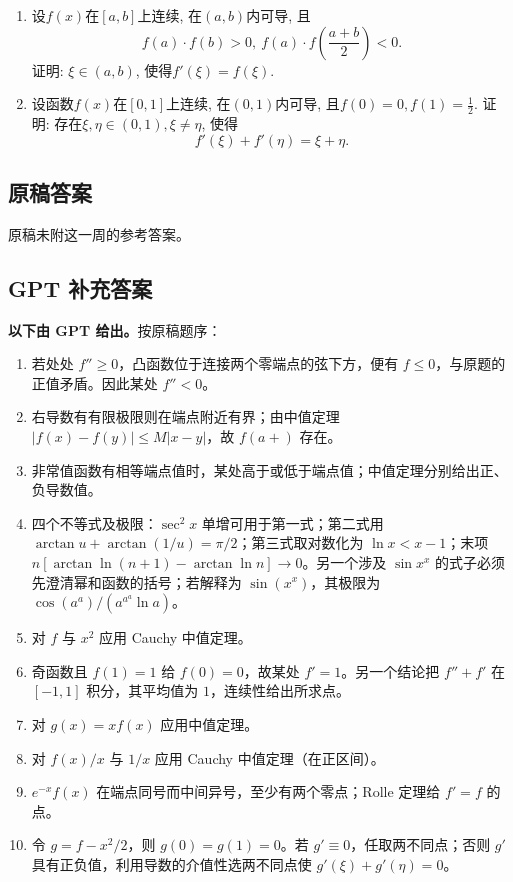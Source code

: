 \documentclass[UTF8,11pt, a4paper, oneside, fontset=none]{ctexbook}
\begin{document}
\begin{enumerate}
\item 设$f(x)$在$[a, b]$上连续, 在$(a, b)$内可导, 且
\[
f(a) \cdot f(b) >0, \ f(a) \cdot f\left( \frac{a+b}{2} \right) <0.
\]
证明: $\xi \in (a, b)$, 使得$f'(\xi) = f(\xi)$.

\item 设函数$f(x)$在$[0, 1]$上连续, 在$(0, 1)$内可导, 且$f(0) = 0, f(1) = \frac{1}{2}$. 证明: 存在$\xi, \eta \in (0, 1), \xi \neq \eta$, 使得
\[
f'(\xi) + f'(\eta) = \xi + \eta.
\]


\end{enumerate}

\clearpage

\subsection*{原稿答案}

\noindent 原稿未附这一周的参考答案。

\clearpage

\subsection*{GPT 补充答案}

\noindent\textbf{以下由 GPT 给出。}按原稿题序：
\begin{enumerate}
\item 若处处 $f''\ge0$，凸函数位于连接两个零端点的弦下方，便有 $f\le0$，与原题的正值矛盾。因此某处 $f''<0$。
\item 右导数有有限极限则在端点附近有界；由中值定理 $|f(x)-f(y)|\le M|x-y|$，故 $f(a+)$ 存在。
\item 非常值函数有相等端点值时，某处高于或低于端点值；中值定理分别给出正、负导数值。
\item 四个不等式及极限：$\sec^2x$ 单增可用于第一式；第二式用 $\arctan u+\arctan(1/u)=\pi/2$；第三式取对数化为 $\ln x<x-1$；末项 $n[\arctan\ln(n+1)-\arctan\ln n]\to0$。另一个涉及 $\sin x^x$ 的式子必须先澄清幂和函数的括号；若解释为 $\sin(x^x)$，其极限为 $\cos(a^a)/(a^{a^a}\ln a)$。
\item 对 $f$ 与 $x^2$ 应用 Cauchy 中值定理。
\item 奇函数且 $f(1)=1$ 给 $f(0)=0$，故某处 $f'=1$。另一个结论把 $f''+f'$ 在 $[-1,1]$ 积分，其平均值为 $1$，连续性给出所求点。
\item 对 $g(x)=xf(x)$ 应用中值定理。
\item 对 $f(x)/x$ 与 $1/x$ 应用 Cauchy 中值定理（在正区间）。
\item $e^{-x}f(x)$ 在端点同号而中间异号，至少有两个零点；Rolle 定理给 $f'=f$ 的点。
\item 令 $g=f-x^2/2$，则 $g(0)=g(1)=0$。若 $g'\equiv0$，任取两不同点；否则 $g'$ 具有正负值，利用导数的介值性选两不同点使 $g'(\xi)+g'(\eta)=0$。
\end{enumerate}
\end{document}

